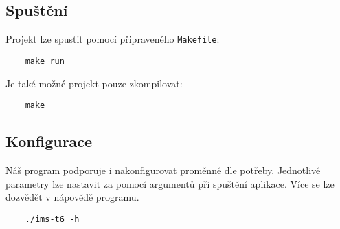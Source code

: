 \documentclass{article}
\begin{document}
\subsection*{Spuštění}

Projekt lze spustit pomocí připraveného \texttt{Makefile}:
\begin{verbatim}
    make run
\end{verbatim}

\noindent Je také možné projekt pouze zkompilovat:
\begin{verbatim}
    make
\end{verbatim}

\subsection*{Konfigurace}

Náš program podporuje i nakonfigurovat proměnné dle potřeby. Jednotlivé
parametry lze nastavit za pomocí argumentů při spuštění aplikace. Více se lze
dozvědět v nápovědě programu.
\begin{verbatim}
    ./ims-t6 -h
\end{verbatim}

\newpage
\nocite{*}
\printbibliography
\end{document}

